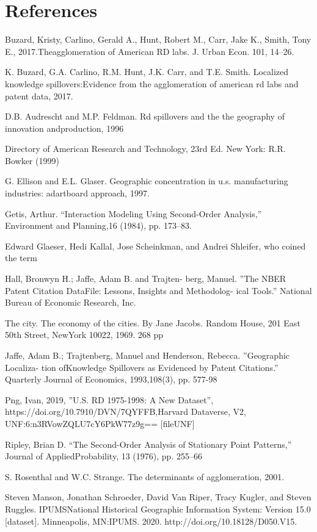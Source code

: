 \documentclass[12pt,letterpaper]{article}
\begin{document}
\section{References}    
\par 
Buzard, Kristy, Carlino, Gerald A., Hunt, Robert M., Carr, Jake K., Smith, Tony E., 2017.Theagglomeration of American RD labs. J. Urban Econ. 101, 14–26.
\par 
K. Buzard, G.A. Carlino, R.M. Hunt, J.K. Carr, and T.E. Smith. Localized knowledge spillovers:Evidence from the agglomeration of american rd labs and patent data, 2017.
\par 
D.B. Audrescht and M.P. Feldman.  Rd spillovers and the the geography of innovation andproduction, 1996
\par 
Directory of American Research and Technology, 23rd Ed. New York: R.R. Bowker (1999)
\par
G. Ellison and E.L. Glaser.   Geographic concentration in u.s.   manufacturing industries:  adartboard approach, 1997.
\par
Getis, Arthur. “Interaction Modeling Using Second-Order Analysis,” Environment and Planning,16 (1984), pp. 173–83.
\par
Edward Glaeser, Hedi Kallal, Jose Scheinkman, and Andrei Shleifer, who coined the term
\par 
Hall, Bronwyn H.; Jaffe, Adam B. and Trajten- berg, Manuel. ”The NBER Patent Citation DataFile: Lessons, Insights and Methodolog- ical Tools.” National Bureau of Economic Research, Inc.
\par
The city. The economy of the cities. By Jane Jacobs. Random House, 201 East 50th Street, NewYork 10022, 1969. 268 pp
\par
Jaffe, Adam B.; Trajtenberg, Manuel and Henderson, Rebecca. ”Geographic Localiza- tion ofKnowledge Spillovers as Evidenced by Patent Citations.” Quarterly Journal of Economics, 1993,108(3), pp. 577-98
\par
Png, Ivan, 2019, ”U.S. RD 1975-1998: A New Dataset”, https://doi.org/10.7910/DVN/7QYFFB,Harvard Dataverse, V2, UNF:6:n3RVowZQLU7cY6PkW77z9g== [fileUNF]
\par
Ripley, Brian D. “The Second-Order Analysis of Stationary Point Patterns,” Journal of AppliedProbability, 13 (1976), pp. 255–66
\par
S. Rosenthal and W.C. Strange. The determinants of agglomeration, 2001.
\par
Steven Manson, Jonathan Schroeder, David Van Riper, Tracy Kugler, and Steven Ruggles. IPUMSNational Historical Geographic Information System:  Version 15.0 [dataset].  Minneapolis, MN:IPUMS. 2020. http://doi.org/10.18128/D050.V15.
\end{document}
